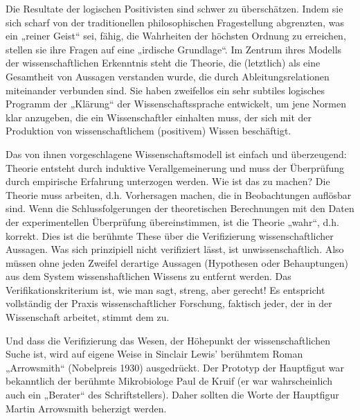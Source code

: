 \documentclass[11pt,a4paper]{article}
\begin{document}
Die Resultate der logischen Positivisten sind schwer zu überschätzen. Indem
sie sich scharf von der traditionellen philosophischen Fragestellung
abgrenzten, was ein „reiner Geist“ sei, fähig, die Wahrheiten der höchsten
Ordnung zu erreichen, stellen sie ihre Fragen auf eine „irdische Grundlage“.
Im Zentrum ihres Modells der wissenschaftlichen Erkenntnis steht die Theorie,
die (letztlich) als eine Gesamtheit von Aussagen verstanden wurde, die durch
Ableitungsrelationen miteinander verbunden sind.  Sie haben zweifellos ein
sehr subtiles logisches Programm der „Klärung“ der Wissenschaftssprache
entwickelt, um jene Normen klar anzugeben, die ein Wissenschaftler einhalten
muss, der sich mit der Produktion von wissenschaftlichem (positivem) Wissen
beschäftigt.

Das von ihnen vorgeschlagene Wissenschaftsmodell ist einfach und überzeugend:
Theorie entsteht durch induktive Verallgemeinerung und muss der Überprüfung
durch empirische Erfahrung unterzogen werden. Wie ist das zu machen? Die
Theorie muss arbeiten, d.h. Vorhersagen machen, die in Beobachtungen auflösbar
sind. Wenn die Schlussfolgerungen der theoretischen Berechnungen mit den Daten
der experimentellen Überprüfung übereinstimmen, ist die Theorie „wahr“, d.h.
korrekt. Dies ist die berühmte These über die Verifizierung wissenschaftlicher
Aussagen. Was sich prinzipiell nicht verifiziert lässt, ist
unwissenschaftlich.  Also müssen ohne jeden Zweifel derartige Aussagen
(Hypothesen oder Behauptungen) aus dem System wissenshaftlichen Wissens zu
entfernt werden. Das Verifikationskriterium ist, wie man sagt, streng, aber
gerecht! Es entspricht vollständig der Praxis wissenschaftlicher Forschung,
faktisch jeder, der in der Wissenschaft arbeitet, stimmt dem zu.

Und dass die Verifizierung das Wesen, der Höhepunkt der wissenschaftlichen
Suche ist, wird auf eigene Weise in Sinclair Lewis' berühmtem Roman
„Arrowsmith“ (Nobelpreis 1930) ausgedrückt. Der Prototyp der Hauptfigut war
bekanntlich der berühmte Mikrobiologe Paul de Kruif (er war wahrscheinlich
auch ein „Berater“ des Schriftstellers). Daher sollten die Worte der
Hauptfigur Martin Arrowsmith beherzigt werden.
\end{document}
